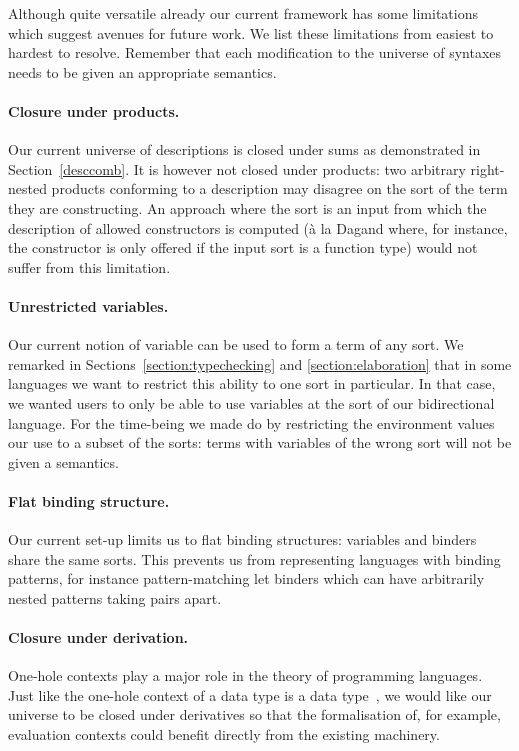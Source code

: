 {Although quite versatile already our current framework has some limitations
which suggest avenues for future work. We list these limitations from easiest
to hardest to resolve. Remember that each modification to the universe of
syntaxes needs to be given an appropriate semantics.

\paragraph{Closure under products.} Our current universe of descriptions is
closed under sums as demonstrated in Section~\ref{desccomb}. It is however
not closed under products: two arbitrary right-nested products conforming
to a description may disagree on the sort of the term they are constructing.
An approach where the sort is an input from which the description of allowed
constructors is computed (à la Dagand \citeyear{DBLP:phd/ethos/Dagand13} where,
for instance, the  constructor is only offered if the input sort is
a function type) would not suffer from this limitation.

\paragraph{Unrestricted variables.} Our current notion of variable can be used
to form a term of any sort. We remarked in Sections~\ref{section:typechecking}
and \ref{section:elaboration} that in some languages we want to restrict this
ability to one sort in particular. In that case, we wanted users to only be able
to use variables at the sort  of our bidirectional language. For the
time-being we made do by restricting the environment values our 
use to a subset of the sorts: terms with variables of the wrong sort will not be
given a semantics.

\paragraph{Flat binding structure.} Our current set-up limits us to flat binding
structures: variables and binders share the same sorts. This prevents us from
representing languages with binding patterns, for instance pattern-matching
let binders which can have arbitrarily nested patterns taking pairs apart.

\paragraph{Closure under derivation.} One-hole contexts play a major role in the
theory of programming languages. Just like the one-hole context of a data type is
a data type~\cite{DBLP:journals/fuin/AbbottAMG05}, we would like our universe to
be closed under derivatives so that the formalisation of, for example, evaluation contexts
could benefit directly from the existing machinery.

}
